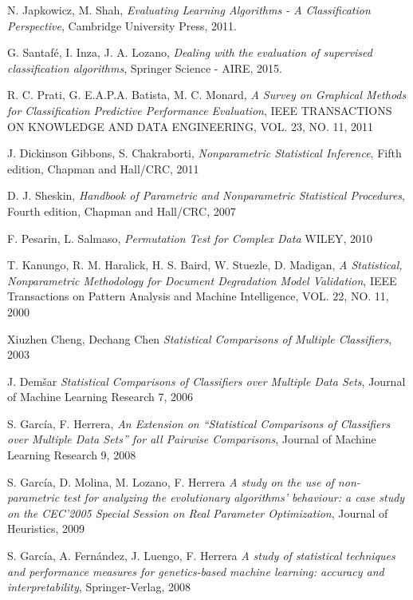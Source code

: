 \begin{thebibliography}{99}

  N. Japkowicz, M. Shah,
  \emph{Evaluating Learning Algorithms - A Classification Perspective},
  Cambridge University Press,
  2011.

  G. Santafé, I. Inza, J. A. Lozano,
  \emph{Dealing with the evaluation of supervised classification algorithms},
  Springer Science - AIRE,
  2015.
  
  R. C. Prati, G. E.A.P.A. Batista, M. C. Monard,
  \emph{A Survey on Graphical Methods for Classification Predictive Performance Evaluation},
  IEEE TRANSACTIONS ON KNOWLEDGE AND DATA ENGINEERING, VOL. 23, NO. 11,
  2011

  J. Dickinson Gibbons, S. Chakraborti,
  \emph{Nonparametric Statistical Inference},
  Fifth edition,
  Chapman and Hall/CRC,
  2011
	
  D. J. Sheskin,
  \emph{Handbook of Parametric and Nonparametric Statistical Procedures},
  Fourth edition,
  Chapman and Hall/CRC,
  2007
  
	F. Pesarin, L. Salmaso,
	\emph{Permutation Test for Complex Data}
	WILEY, 
	2010
  
	T. Kanungo, R. M. Haralick, H. S. Baird, W. Stuezle, D. Madigan,
  \emph{A Statistical, Nonparametric Methodology for Document Degradation Model Validation},
  IEEE Transactions on Pattern Analysis and Machine Intelligence,
  VOL. 22, NO. 11,
  2000
  
	Xiuzhen Cheng, Dechang Chen
  \emph{Statistical Comparisons of Multiple Classifiers},
  2003
  
	J. Dem\v{s}ar
	\emph{Statistical Comparisons of Classifiers over Multiple Data Sets},
	Journal of Machine Learning Research 7,
	2006
	
	
	S. García, F. Herrera,
	\emph{An Extension on ``Statistical Comparisons of Classifiers over Multiple Data Sets'' for all Pairwise Comparisons},
	Journal of Machine Learning Research 9,
	2008
	
	S. García, D. Molina, M. Lozano, F. Herrera
	\emph{A study on the use of non-parametric test for analyzing the evolutionary algorithms' behaviour: a case study on the CEC'2005 Special Session on Real Parameter Optimization},
	Journal of Heuristics,
	2009

	S. García, A. Fernández, J. Luengo, F. Herrera
	\emph{A study of statistical techniques and performance measures for genetics-based machine learning: accuracy and interpretability},
	Springer-Verlag,
	2008
	

\end{thebibliography}
